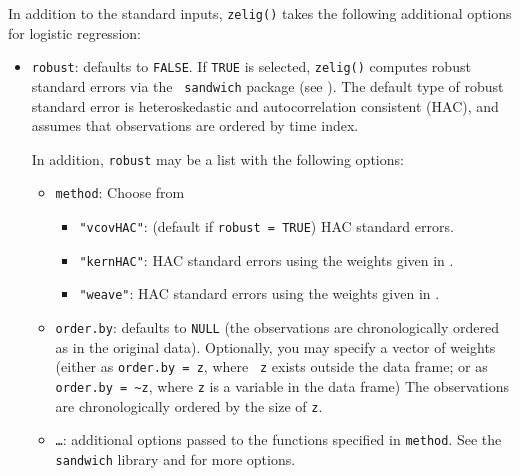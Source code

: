 In addition to the standard inputs, {\tt zelig()} takes the following
additional options for logistic regression:  
\begin{itemize}
\item {\tt robust}: defaults to {\tt FALSE}.  If {\tt TRUE} is
selected, {\tt zelig()} computes robust standard errors via the {\tt
sandwich} package (see \cite{Zeileis04}).  The default type of robust
standard error is heteroskedastic and autocorrelation consistent (HAC),
and assumes that observations are ordered by time index.

In addition, {\tt robust} may be a list with the following options:  
\begin{itemize}
\item {\tt method}:  Choose from 
\begin{itemize}
\item {\tt "vcovHAC"}: (default if {\tt robust = TRUE}) HAC standard
errors. 
\item {\tt "kernHAC"}: HAC standard errors using the
weights given in \cite{Andrews91}. 
\item {\tt "weave"}: HAC standard errors using the
weights given in \cite{LumHea99}.  
\end{itemize}  
\item {\tt order.by}: defaults to {\tt NULL} (the observations are
chronologically ordered as in the original data).  Optionally, you may
specify a vector of weights (either as {\tt order.by = z}, where {\tt
z} exists outside the data frame; or as {\tt order.by = \~{}z}, where
{\tt z} is a variable in the data frame)  The observations are
chronologically ordered by the size of {\tt z}.
\item {\tt \dots}:  additional options passed to the functions 
specified in {\tt method}.   See the {\tt sandwich} library and
\cite{Zeileis04} for more options.   
\end{itemize}
\end{itemize}

